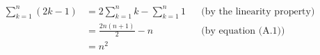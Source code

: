 \setlength{\abovedisplayskip}{-\baselineskip}
\begin{align*}
    \sum_{k=1}^n(2k-1) &= 2\sum_{k=1}^nk-\sum_{k=1}^n1 && \text{(by the linearity property)} \\[1mm]
    &= \frac{2n(n+1)}{2}-n && \text{(by equation (A.1))} \\
    &= n^2
\end{align*}
